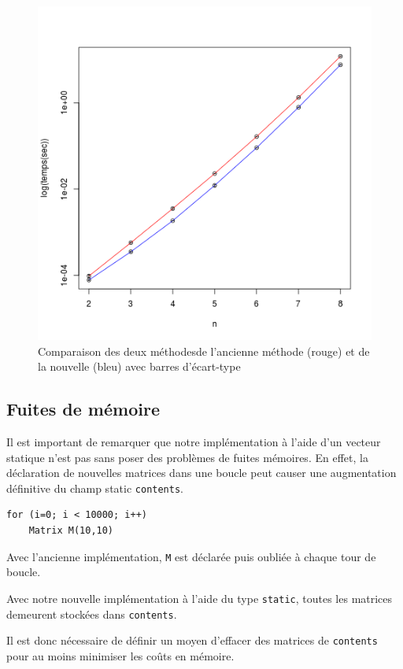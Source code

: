 \documentclass[a4paper,11pt]{article}
\begin{document}
\begin{figure}
  \centering
  \includegraphics[scale=0.5]{Comparaison.png}
  \caption{Comparaison des deux méthodesde l'ancienne méthode (rouge) et de la nouvelle (bleu) avec barres d'écart-type}
  \label{fig:phd}
\end{figure}


\subsection{Fuites de mémoire}

Il est important de remarquer que notre implémentation à l'aide d'un vecteur statique n'est pas sans poser des problèmes de fuites mémoires.
En effet, la déclaration de nouvelles matrices dans une boucle peut causer une augmentation définitive du champ static \texttt{contents}.

\begin{lstlisting}
for (i=0; i < 10000; i++)
    Matrix M(10,10)
\end{lstlisting}


Avec l'ancienne implémentation, \texttt{M} est déclarée puis oubliée à chaque tour de boucle.

Avec notre nouvelle implémentation à l'aide du type \texttt{static}, toutes les matrices demeurent stockées dans \texttt{contents}.

Il est donc nécessaire de définir un moyen d'effacer des matrices de \texttt{contents} pour au moins minimiser les coûts en mémoire.
\end{document}
